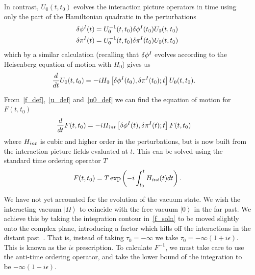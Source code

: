 In contrast, $U_0(t,t_0)$ evolves the interaction picture operators in time
using only the part of the Hamiltonian quadratic in the perturbations
\begin{align}
    \delta\phi^I(t) &= U_0^{-1}(t,t_0)\delta\phi^I(t_0)U_0(t,t_0)\\
    \delta\pi^I(t) &= U_0^{-1}(t,t_0)\delta\pi^I(t_0)U_0(t,t_0)
\end{align}
which by a similar calculation (recalling that $\delta\phi^I$ evolves
according to the Heisenberg equation of motion with $H_0$) gives us
\begin{align}
    \frac{d}{dt}U_0(t,t_0) &= -iH_0\left[\delta\phi^I(t_0),\delta\pi^I(t_0);t\right]U_0(t,t_0).\label{u0_def}
\end{align}


From~\eqref{f_def},~\eqref{u_def} and~\eqref{u0_def} we can find the equation of motion for $F(t,t_0)$
\begin{align}
    \frac{d}{dt}F(t,t_0) &= -iH_{int}\left[\delta\phi^I(t),\delta\pi^I(t);t\right]F(t,t_0)
\end{align}
where $H_{int}$ is cubic and higher order in the perturbations,
but is now built from the interaction picture fields evaluated at $t$.
This can be solved using the standard time ordering operator $T$
\begin{align}\label{f_soln}
    F(t,t_0) = T\exp\left(-i\int^t_{t_0}H_{int}(t)dt\right).
\end{align}


We have not yet accounted for the evolution of the vacuum state.
We wish the interacting vacuum $\left|\Omega\right>$
to coincide with the free vacuum $\left|0\right>$ in the far past.
We achieve this by taking the integration contour in~\eqref{f_soln} to be
moved slightly onto the complex plane, introducing a factor which kills off the
interactions in the distant past~\cite{Maldacena}.
That is, instead of taking
$\tau_0=-\infty$ we take $\tau_0=-\infty(1+i\epsilon)$.
This is known as the $i\epsilon$ prescription.
To calculate $F^{-1}$, we must take care to use the anti-time ordering operator,
and take the lower bound of the integration to be $-\infty(1-i\epsilon)$.


